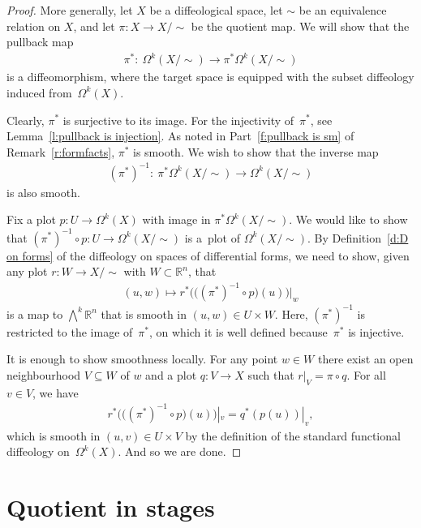 \documentclass[pdftex]{sigma}
\numberwithin{equation}{section}
\newcommand{\RR}{{\mathbb{R}}} %
\newcommand{\hypref}[2]{{#2~\ref{#1}}}
\begin{document}
\begin{proof}
More generally,
let $X$ be a dif\/feological space, let $\sim$ be an equivalence relation
on $X$, and let $\pi \colon X \to X/\!\!\sim$ be the quotient map.
We will show that the pullback map
\begin{gather*} \pi^* \colon \ \Omega^k(X/\!\!\sim) \to \pi^*\Omega^k(X/\!\!\sim) \end{gather*}
is a dif\/feomorphism,
where the target space is equipped with the subset dif\/feology
induced \linebreak from~$\Omega^k(X)$.

Clearly, $\pi^*$ is surjective to its image.
For the injectivity of~$\pi^*$, see \hypref{l:pullback is injection}{Lemma}.
As noted in Part~\eqref{f:pullback is sm} of \hypref{r:formfacts}{Remark},
$\pi^*$ is smooth.
We wish to show that the inverse map
\begin{gather*} (\pi^*)^{-1} \colon \ \pi^*\Omega^k(X/\!\!\sim) \to \Omega^k(X/\!\!\sim) \end{gather*}
is also smooth.

Fix a plot $p \colon U \to \Omega^k(X)$
with image in $\pi^*\Omega^k(X/\!\!\sim)$.
We would like to show
that $(\pi^*)^{-1} \circ p \colon U \to \Omega^k(X/\!\!\sim)$
is a~plot of $\Omega^k(X/\!\!\sim)$.
By \hypref{d:D on forms}{Def\/inition} of the dif\/feology
on spaces of dif\/ferential forms,
we need to show, given any plot $r \colon W \to X/\!\!\sim$
with $W \subset \RR^n$, that
\begin{gather*} (u,w)\mapsto r^* \big( \big( (\pi^*)^{-1} \circ p \big) (u) \big)\big|_w \end{gather*}
is a map to $\bigwedge^k \RR^n$ that is smooth in $(u,w) \in U \times W$.
Here, $(\pi^*)^{-1}$ is restricted to the image of~$\pi^*$,
on which it is well def\/ined because~$\pi^*$ is injective.

It is enough to show smoothness locally.
For any point $w\in W$ there exist an open neighbourhood $V\subseteq W$ of $w$
and a plot $q \colon V\to X$ such that $r|_V = \pi\circ q$.
For all $v\in V$, we have
\begin{gather*} r^* \big( \big((\pi^*)^{-1}\circ p\big)(u) \big)|_v = q^*(p(u))|_v,\end{gather*}
which is smooth in $(u,v) \in U \times V$
by the def\/inition of the standard functional dif\/feology on~$\Omega^k(X)$.
And so we are done.
\end{proof}

\section{Quotient in stages}\label{sec:q in stages}
\end{document}
